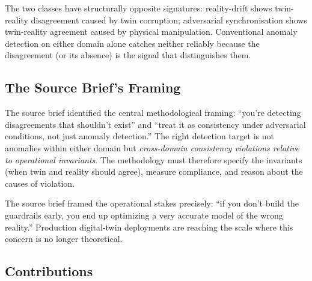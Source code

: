 \documentclass[sigconf,nonacm]{acmart}
\begin{document}
The two classes have structurally opposite signatures: reality-drift
shows twin-reality disagreement caused by twin corruption;
adversarial synchronisation shows twin-reality agreement caused
by physical manipulation. Conventional anomaly detection on either
domain alone catches neither reliably because the disagreement (or
its absence) is the signal that distinguishes them.

\subsection{The Source Brief's Framing}

The source brief identified the central methodological framing:
``you're detecting disagreements that shouldn't exist'' and
``treat it as consistency under adversarial conditions, not just
anomaly detection.'' The right detection target is not anomalies
within either domain but \emph{cross-domain consistency
violations relative to operational invariants}. The methodology
must therefore specify the invariants (when twin and reality should
agree), measure compliance, and reason about the causes of
violation.

The source brief framed the operational stakes precisely: ``if you
don't build the guardrails early, you end up optimizing a very
accurate model of the wrong reality.'' Production digital-twin
deployments are reaching the scale where this concern is no
longer theoretical.

\subsection{Contributions}
\end{document}
